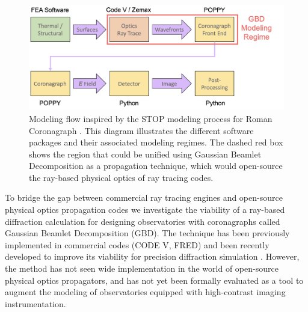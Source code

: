
\begin{figure}[H]
	\centering
	\includegraphics[width=\textwidth]{stop_flow.png}
	\caption{Modeling flow inspired by the STOP modeling process for Roman Coronagraph \cite{Krist18}. This diagram illustrates the different software packages and their associated modeling regimes. The dashed red box shows the region that could be unified using Gaussian Beamlet Decomposition as a propagation technique, which would open-source the ray-based physical optics of ray tracing codes.}
\end{figure} 

To bridge the gap between commercial ray tracing engines and open-source physical optics propagation codes we investigate the viability of a ray-based diffraction calculation for designing observatories with coronagraphs called Gaussian Beamlet Decomposition (GBD). The technique has been previously implemented in commercial codes (CODE V\cite{StoneTechMemo}, FRED\cite{FredTechMemo}) and been recently developed to improve its viability for precision diffraction simulation \cite{Worku17,Worku:18,Worku19}. However, the method has not seen wide implementation in the world of open-source physical optics propagators, and has not yet been formally evaluated as a tool to augment the modeling of observatories equipped with high-contrast imaging instrumentation. 

